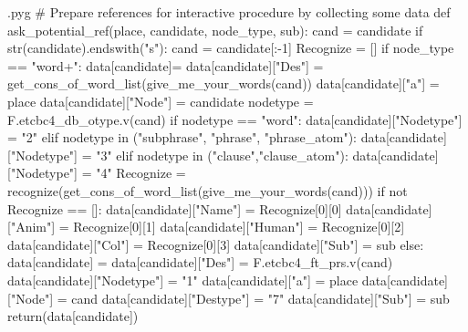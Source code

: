\documentclass{report}
\makeatletter
\newenvironment{python}{%
  \VerbatimEnvironment
  \minted@resetoptions
  \setkeys{minted@opt}{}
      \begin{VerbatimOut}{\jobname.pyg}}
{%
      \end{VerbatimOut}
      \minted@pygmentize{python}
      \DeleteFile{\jobname.pyg}}
\makeatother
\begin{document}
\begin{python}
# Prepare references for interactive procedure by collecting some data
def ask_potential_ref(place, candidate, node_type, sub):
    cand = candidate
    if str(candidate).endswith("s"):
        cand = candidate[:-1]
    Recognize = []
    if node_type == "word+": 
        data[candidate]= {}
        data[candidate]["Des"] = get_cons_of_word_list(give_me_your_words(cand))
        data[candidate]["a"] = place
        data[candidate]["Node"] = candidate
        nodetype = F.etcbc4_db_otype.v(cand)
        if nodetype == "word":
            data[candidate]["Nodetype"] = "2"
        elif nodetype in ("subphrase", "phrase", "phrase_atom"):
            data[candidate]["Nodetype"] = "3"
        elif nodetype in ("clause","clause_atom"):
            data[candidate]["Nodetype"] = "4"
        Recognize = recognize(get_cons_of_word_list(give_me_your_words(cand)))
        if not Recognize == []:
            data[candidate]["Name"] = Recognize[0][0]
            data[candidate]["Anim"] = Recognize[0][1]
            data[candidate]["Human"] = Recognize[0][2]
            data[candidate]["Col"] = Recognize[0][3]
        data[candidate]["Sub"] = sub
    else:
        data[candidate] = {}
        data[candidate]["Des"] = F.etcbc4_ft_prs.v(cand)
        data[candidate]["Nodetype"] = "1"
        data[candidate]["a"] = place
        data[candidate]["Node"] = cand
        data[candidate]["Destype"] = "7"
        data[candidate]["Sub"] = sub
    return(data[candidate])

\end{python}
\end{document}
